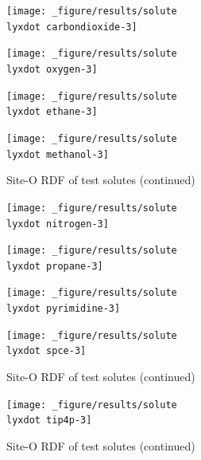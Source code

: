 \begin{figure}[!tbph]
\ContinuedFloat
\begin{centering}
\texttt{[image: \_figure/results/solute\\lyxdot carbondioxide-3]}
\par\end{centering}
\begin{centering}
\texttt{[image: \_figure/results/solute\\lyxdot oxygen-3]}
\par\end{centering}
\begin{centering}
\texttt{[image: \_figure/results/solute\\lyxdot ethane-3]}
\par\end{centering}
\begin{centering}
\texttt{[image: \_figure/results/solute\\lyxdot methanol-3]}
\par\end{centering}
\caption[]{Site-O \acs{RDF} of test solutes (continued)}
\end{figure}

\begin{figure}[!tbph]
\ContinuedFloat
\begin{centering}
\texttt{[image: \_figure/results/solute\\lyxdot nitrogen-3]}
\par\end{centering}
\begin{centering}
\texttt{[image: \_figure/results/solute\\lyxdot propane-3]}
\par\end{centering}
\begin{centering}
\texttt{[image: \_figure/results/solute\\lyxdot pyrimidine-3]}
\par\end{centering}
\begin{centering}
\texttt{[image: \_figure/results/solute\\lyxdot spce-3]}
\par\end{centering}
\caption[]{Site-O \acs{RDF} of test solutes (continued)}
\end{figure}

\begin{figure}[!tbph]
\ContinuedFloat
\begin{centering}
\texttt{[image: \_figure/results/solute\\lyxdot tip4p-3]}
\par\end{centering}
\caption[]{Site-O \acs{RDF} of test solutes (continued)}
\end{figure}

